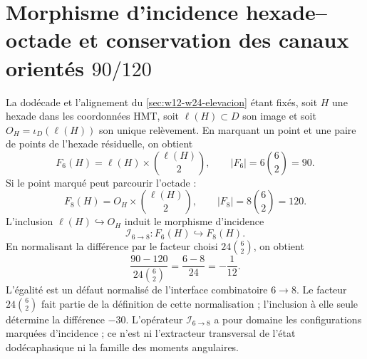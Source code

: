 \section{Morphisme d’incidence hexade--octade et conservation des canaux orientés \(90/120\)}

La dodécade et l’alignement du
\cref{sec:w12-w24-elevacion} étant fixés, soit \(H\) une hexade dans les coordonnées HMT,
soit \(\ell(H)\subset D\) son image et soit
\(O_H=\iota_D(\ell(H))\) son unique relèvement. En marquant un point
et une paire de points de l’hexade résiduelle, on obtient
\[
F_6(H)=\ell(H)\times\binom{\ell(H)}2,
\qquad
|F_6|=6\binom62=90.
\]
Si le point marqué peut parcourir l’octade :
\[
F_8(H)=O_H\times\binom{\ell(H)}2,
\qquad
|F_8|=8\binom62=120.
\]
L’inclusion \(\ell(H)\hookrightarrow O_H\) induit le morphisme d’incidence
\[
 \mathcal I_{6\to8}:F_6(H)\hookrightarrow F_8(H).
\]
En normalisant la différence par le facteur
choisi \(24\binom62\), on obtient
\[
\boxed{
\frac{90-120}{24\binom62}
=\frac{6-8}{24}
=-\frac1{12}.}
\]
L’égalité est un défaut normalisé de l’interface combinatoire
\(6\to8\). Le facteur \(24\binom62\) fait partie de la définition de cette
normalisation ; l’inclusion à elle seule détermine la différence \(-30\).
L’opérateur \(\mathcal I_{6\to8}\) a pour domaine les configurations
marquées d’incidence ; ce n’est ni l’extracteur transversal de l’état
dodécaphasique ni la famille des moments angulaires.
